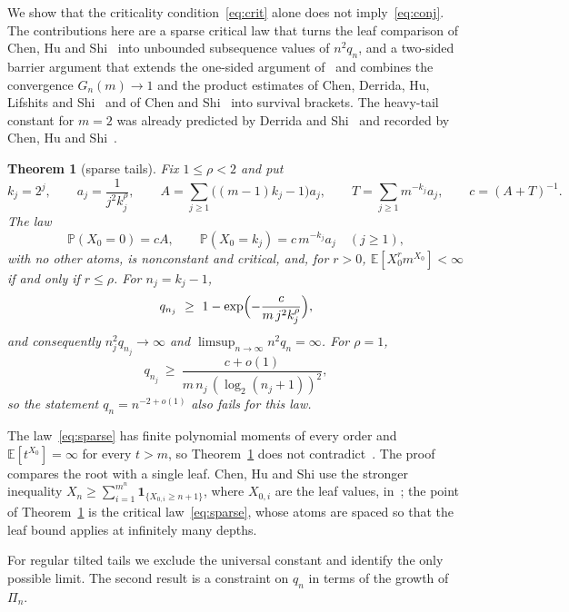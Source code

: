 \documentclass[11pt]{amsart}
\newtheorem{theorem}{Theorem}[section]
\theoremstyle{remark}
\numberwithin{equation}{section}
\newcommand{\PP}{\mathbb{P}}
\newcommand{\EE}{\mathbb{E}}
\begin{document}
We show that the criticality condition~\eqref{eq:crit} alone does not imply~\eqref{eq:conj}. The contributions here are a sparse critical law that turns the leaf comparison of Chen, Hu and Shi~\cite[Remark~1.2]{CHS24} into unbounded subsequence values of $n^2q_n$, and a two-sided barrier argument that extends the one-sided argument of~\cite{Sh} and combines the convergence $G_n(m)\to1$ and the product estimates of Chen, Derrida, Hu, Lifshits and Shi~\cite{CDHLS} and of Chen and Shi~\cite{CS} into survival brackets. The heavy-tail constant for $m=2$ was already predicted by Derrida and Shi~\cite{DS} and recorded by Chen, Hu and Shi~\cite{CHS22}.

\begin{theorem}[sparse tails]\label{thm:sparse}
Fix $1\le\rho<2$ and put
\[
k_j=2^j,\qquad a_j=\frac{1}{j^2k_j^{\rho}},\qquad A=\sum_{j\ge1}\bigl((m-1)k_j-1\bigr)a_j,\qquad T=\sum_{j\ge1}m^{-k_j}a_j,\qquad c=(A+T)^{-1}.
\]
The law
\begin{equation}\label{eq:sparse}
\PP(X_0=0)=cA,\qquad \PP(X_0=k_j)=c\,m^{-k_j}a_j\quad(j\ge1),
\end{equation}
with no other atoms, is nonconstant and critical, and, for $r>0$, $\EE[X_0^rm^{X_0}]<\infty$ if and only if $r\le\rho$. For $n_j=k_j-1$,
\begin{equation}\label{eq:spike}
q_{n_j}\ \ge\ 1-\exp\Bigl(-\frac{c}{m\,j^2k_j^{\rho}}\Bigr),
\end{equation}
and consequently $n_j^2q_{n_j}\to\infty$ and $\limsup_{n\to\infty}n^2q_n=\infty$. For $\rho=1$,
\begin{equation}\label{eq:rho1}
q_{n_j}\ \ge\ \frac{c+o(1)}{m\,n_j\,(\log_2(n_j+1))^2},
\end{equation}
so the statement $q_n=n^{-2+o(1)}$ also fails for this law.
\end{theorem}

The law~\eqref{eq:sparse} has finite polynomial moments of every order and $\EE[t^{X_0}]=\infty$ for every $t>m$, so Theorem~\ref{thm:sparse} does not contradict~\cite[Theorem~1.2]{CHS22}. The proof compares the root with a single leaf. Chen, Hu and Shi use the stronger inequality $X_n\ge\sum_{i=1}^{m^n}\mathbf 1_{\{X_{0,i}\ge n+1\}}$, where $X_{0,i}$ are the leaf values, in~\cite[Remark~1.2]{CHS24}; the point of Theorem~\ref{thm:sparse} is the critical law~\eqref{eq:sparse}, whose atoms are spaced so that the leaf bound applies at infinitely many depths.

For regular tilted tails we exclude the universal constant and identify the only possible limit. The second result is a constraint on $q_n$ in terms of the growth of $\Pi_n$.
\end{document}
